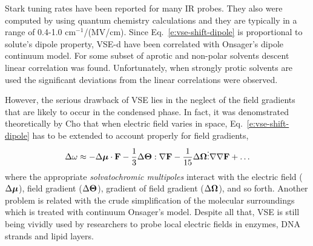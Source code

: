 \documentclass[a4paper,titlepage,twoside,fleqn,12pt]{book}
\newcommand{\BM}[1]{\ensuremath{\mbox{\boldmath${#1}$}}}
\begin{document}
\begin{refsection}
\begin{equation}
\end{equation}
%
Stark tuning rates have been reported for many IR probes.\citep{Suydam.Boxer.Biochem.2003,Levinson.Fried.Boxer.JPCB.2012}
They also were computed by using quantum chemistry calculations\citep{Dalosto.Vanderkooi.Sharp.JPCB.2004,
Andrews.Boxer.JCPA.2002,Andrews.Boxer.JCPA.2000}
and they are typically in a range of 0.4-1.0 cm$^{-1}$/(MV/cm). 
Since Eq.~\eqref{e:vse-shift-dipole} is proportional to solute's
dipole property, VSE-d have been correlated with Onsager's dipole
continuum model. For some subset of aprotic and non-polar
solvents descent linear correlation was found.\citep{Levinson.Fried.Boxer.JPCB.2012} 
Unfortunately,
when strongly protic solvents are used the significant deviations
from the linear correlations were observed.\citep{Fafarman.Sigala.Herschlag.Boxer.JACS.2010,Bagchi.Fried.Boxer.JACS.2012}

However, the serious drawback of VSE lies in the neglect of the field gradients that are 
likely to occur in the condensed phase. In fact, it was denomstrated theoretically
by Cho\citep{Cho.JCP.2009,Lee.Choi.Cho.JCP.2012} 
that when electric field varies in space, Eq.~\eqref{e:vse-shift-dipole}
has to be extended to account properly for field gradients,
%
\begin{equation} \label{e:vse-shift-multipoles}
 \Delta \omega 
\approx 
             - \Delta {\BM \mu}    \cdot               {\bf F} 
- \frac{1}{3}  \Delta {\BM \Theta} :      \nabla       {\bf F}
- \frac{1}{15} \Delta {\BM \Omega} \vdots \nabla\nabla {\bf F}
+ \ldots
\end{equation}
%
where the appropriate \emph{solvatochromic multipoles}
interact with the electric field ($\Delta {\BM \mu}$), 
field gradient ($\Delta {\BM \Theta}$), gradient of field gradient ($\Delta {\BM \Omega}$),
and so forth.
Another problem is related with the crude simplification of the 
molecular surroundings which is treated with continuum Onsager's model.
Despite all that, VSE is still being vividly
used by researchers to probe local electric fields in enzymes, DNA strands and 
lipid layers. 


\end{refsection}
\end{document}
